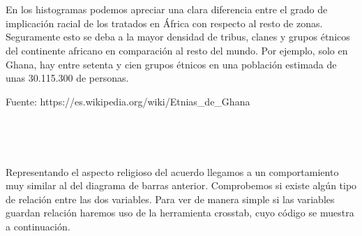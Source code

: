 \documentclass[11pt]{article}
\begin{document}
    \begin{center}
    \end{center}
    { \hspace*{\fill} \\}
    
    \begin{center}
    \end{center}
    { \hspace*{\fill} \\}
    
    En los histogramas podemos apreciar una clara diferencia entre el grado
de implicación racial de los tratados en África con respecto al resto de
zonas. Seguramente esto se deba a la mayor densidad de tribus, clanes y
grupos étnicos del continente africano en comparación al resto del
mundo. Por ejemplo, solo en Ghana, hay entre setenta y cien grupos
étnicos en una población estimada de unas 30.115.300 de personas.

Fuente: https://es.wikipedia.org/wiki/Etnias\_de\_Ghana

    \begin{center}
    \end{center}
    { \hspace*{\fill} \\}
    
    \begin{center}
    \end{center}
    { \hspace*{\fill} \\}
    
    Representando el aspecto religioso del acuerdo llegamos a un comportamiento muy similar al del diagrama de barras anterior. 
Comprobemos si existe algún tipo de relación entre las dos variables. Para ver de manera simple si las variables guardan relación haremos uso de la herramienta crosstab, cuyo código se muestra a continuación.
\end{document}
